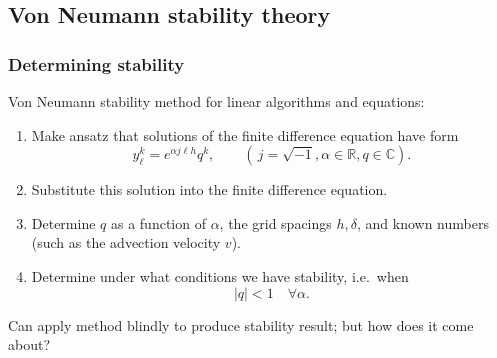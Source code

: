 \documentclass{beamer}
\begin{document}
\subsection{Von Neumann stability theory}

\begin{frame}
  \frametitle{Determining stability}

  Von Neumann stability method for linear algorithms and equations:
  \begin{enumerate}
  \item<2-> Make ansatz that solutions of the finite difference
    equation have form
    \begin{equation*}
      y_{\ell}^k =  e^{\alpha j \ell h} q^k, \qquad (\, j = \sqrt{-1}, \alpha \in {\mathbb R}, q \in {\mathbb C} ).
    \end{equation*}
  \item<3-> Substitute this solution into the finite difference
    equation.
  \item<4-> Determine $q$ as a function of $\alpha$, the grid spacings
    $h,\delta$, and known numbers (such as the advection velocity
    $v$).
  \item<5-> Determine under what conditions we have stability, i.e.\ when
    \begin{equation*}
      |q| < 1 \quad \forall \alpha.
    \end{equation*}
  \end{enumerate} \pause[6] 
  Can apply method blindly to produce stability result; but how does
  it come about?
  
\end{frame}
\end{document}

